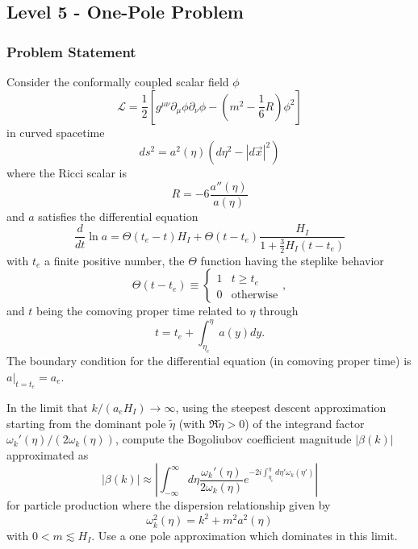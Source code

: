 
\subsection{Level 5 - One-Pole Problem}
\label{app:onepole}
\footnotesize



\subsubsection*{Problem Statement}

Consider the conformally coupled scalar field $\phi$ 
\begin{equation}
\mathcal{L}=\frac{1}{2}\left[g^{\mu\nu}\partial_{\mu}\phi\partial_{\nu}\phi-\left(m^{2}-\frac{1}{6}R\right)\phi^{2}\right]
\end{equation}
 in curved spacetime
\[
ds^{2}=a^{2}(\eta)\left(d\eta^{2}-|d\vec{x}|^{2}\right)
\]
where the Ricci scalar is 
\begin{equation}
R=-6\frac{a''(\eta)}{a(\eta)}
\end{equation}
and $a$ satisfies the differential equation
\begin{equation}
\frac{d}{dt}\ln a=\Theta(t_{e}-t)H_{I}+\Theta(t-t_{e})\frac{H_{I}}{1+\frac{3}{2}H_{I}(t-t_{e})}\label{eq:scalefactor-onepole}
\end{equation}
with $t_{e}$ a finite positive number, the $\Theta$ function having
the steplike behavior
\begin{equation}
\Theta(t-t_{e})\equiv\begin{cases}
1 & t\geq t_{e}\\
0 & \mbox{otherwise}
\end{cases},
\end{equation}
and $t$ being the comoving proper time related to $\eta$ through
\begin{equation}
t=t_{e}+\int_{\eta_{e}}^{\eta}a(y)dy.
\end{equation}
The boundary condition for the differential equation (in comoving
proper time) is $a|_{t=t_{e}}=a_{e}$.

In the limit that $k/(a_{e}H_{I})\rightarrow\infty$, using the steepest
descent approximation starting from the dominant pole $\tilde{\eta}$
(with $\Re\tilde{\eta}>0$) of the integrand factor $\omega_{k}'(\eta)/\left(2\omega_{k}(\eta)\right)$,
compute the Bogoliubov coefficient magnitude $|\beta(k)|$ approximated
as 
\begin{equation}
|\beta(k)|\approx\left|\int_{-\infty}^{\infty}d\eta\frac{\omega_{k}'(\eta)}{2\omega_{k}(\eta)}e^{-2i\int_{\eta_{e}}^{\eta}d\eta'\omega_{k}(\eta')}\right|\label{eq:originalbeta}
\end{equation}
for particle production where the dispersion relationship given by
\begin{equation}
\omega_{k}^{2}(\eta)=k^{2}+m^{2}a^{2}(\eta)
\end{equation}
with $0<m\lesssim H_{I}$. Use a one pole approximation which dominates
in this limit.


